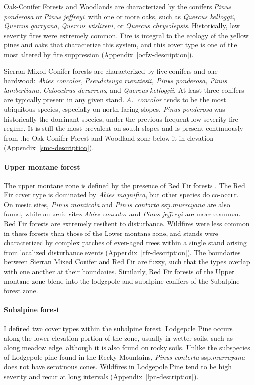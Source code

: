 Oak-Conifer Forests and Woodlands are characterized by the conifers \emph{Pinus ponderosa} or \emph{Pinus jeffreyi}, with one or more oaks, such as \emph{Quercus kelloggii}, \emph{Quercus garryana}, \emph{Quercus wislizeni}, or \emph{Quercus chrysolepsis}. Historically, low severity fires were extremely common. Fire is integral to the ecology of the yellow pines and oaks that characterize this system, and this cover type is one of the most altered by fire suppression (Appendix~\ref{ocfw-description}).

Sierran Mixed Conifer forests are characterized by five conifers and one hardwood: \emph{Abies concolor, Pseudotsuga menziesii, Pinus ponderosa, Pinus lambertiana, Calocedrus decurrens}, and \emph{Quercus kelloggii}. At least three conifers are typically present in any given stand. \emph{A.~concolor} tends to be the most ubiquitous species, especially on north-facing slopes. \emph{Pinus ponderosa} was historically the dominant species, under the previous frequent low severity fire regime. It is still the most prevalent on south slopes and is present continuously from the Oak-Conifer Forest and Woodland zone below it in elevation (Appendix~\ref{smc-description}).


\paragraph{Upper montane forest} The upper montane zone is defined by the presence of Red Fir forests \citep{Potter1998}. The Red Fir cover type is dominated by \emph{Abies magnifica}, but other species do co-occur. On mesic sites, \emph{Pinus monticola} and \emph{Pinus contorta} ssp.\@ \emph{murrayana} are also found, while on xeric sites \emph{Abies concolor} and \emph{Pinus jeffreyi} are more common. Red Fir forests are extremely resilient to disturbance. Wildfires were less common in these forests than those of the Lower montane zone, and stands were characterized by complex patches of even-aged trees within a single stand arising from localized disturbance events (Appendix~\ref{rfr-description}). The boundaries between Sierran Mixed Conifer and Red Fir are fuzzy, such that the types overlap with one another at their boundaries. Similarly, Red Fir forests of the Upper montane zone blend into the lodgepole and subalpine conifers of the Subalpine forest zone.


\paragraph{Subalpine forest} I defined two cover types within the subalpine forest. Lodgepole Pine occurs along the lower elevation portion of the zone, usually in wetter soils, such as along meadow edge, although it is also found on rocky soils. Unlike the subspecies of Lodgepole pine found in the Rocky Mountains, \emph{Pinus contorta} ssp.\@ \emph{murrayana} does not have serotinous cones. Wildfires in Lodgepole Pine tend to be high severity and recur at long intervals (Appendix~\ref{lpn-description}).%

